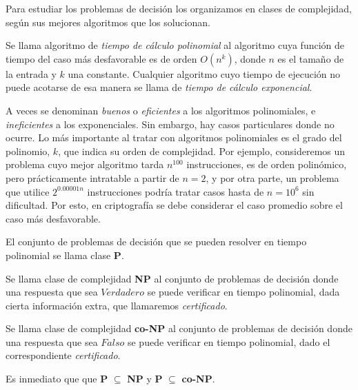 Para estudiar los problemas de decisión los organizamos en clases de complejidad, según sus mejores algoritmos que los solucionan.


\begin{definition}
	Se llama algoritmo de \textit{tiempo de cálculo polinomial} al algoritmo cuya función de tiempo del caso más desfavorable es de orden $O(n^k)$, donde $n$ es el tamaño de la entrada y $k$ una constante. Cualquier algoritmo cuyo tiempo de ejecución no puede acotarse de esa manera se llama de \textit{tiempo de cálculo exponencial}.
\end{definition}

A veces se denominan \textit{buenos} o \textit{eficientes} a los algoritmos polinomiales, e \textit{ineficientes} a los exponenciales. Sin embargo, hay casos particulares donde no ocurre. Lo más importante al tratar con algoritmos polinomiales es el grado del polinomio, $k$, que indica su orden de complejidad. Por ejemplo, consideremos un problema cuyo mejor algoritmo tarda $n^{100}$ instrucciones, es de orden polinómico, pero prácticamente intratable a partir de $n=2$, y por otra parte, un problema que utilice $2^{0.00001n}$ instrucciones podría tratar casos hasta de $n=10^6$ sin dificultad.
Por esto, en criptografía se debe considerar el caso promedio sobre el caso más desfavorable.


\begin{definition}
	El conjunto de problemas de decisión que se pueden resolver en tiempo polinomial se llama clase \textbf{P}.
\end{definition}

\begin{definition}
	\label{def:NP}
	Se llama clase de complejidad \textbf{NP} al conjunto de problemas de decisión donde una respuesta que sea $Verdadero$ se puede verificar en tiempo polinomial, dada cierta información extra, que llamaremos \textit{certificado}.
\end{definition}

\begin{definition}
	Se llama clase de complejidad \textbf{co-NP} al conjunto de problemas de decisión donde una respuesta que sea $Falso$ se puede verificar en tiempo polinomial, dado el correspondiente \textit{certificado}.
\end{definition}

Es inmediato que  que \textbf{P} $\subseteq$ \textbf{NP} y \textbf{P} $\subseteq$ \textbf{co-NP}.

